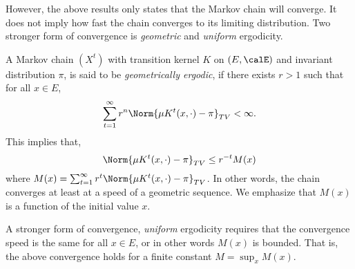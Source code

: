 However, the above results only states that the Markov chain will converge. It does not imply how fast the chain converges to its limiting distribution. Two stronger form of convergence is \emph{geometric} and \emph{uniform} ergodicity.

A Markov chain $(X^t)$ with transition kernel $K$ on $(E,\calE)$ and invariant distribution $\pi$, is said to be \emph{geometrically ergodic}, if there exists $r > 1$ such that for all $x\in E$,
\begin{equation}
  \sum_{t=1}^{\infty} r^n\Norm{\mu K^t(x,\cdot)-\pi}_{TV} <\infty.
\end{equation}
This implies that,
\begin{equation}
  \Norm{\mu K^t(x,\cdot)-\pi}_{TV}\le r^{-t}M(x)
\end{equation}
where $M(x) = \sum_{t=1}^{\infty} r^t\Norm{\mu K^t(x,\cdot)-\pi}_{TV}$. In other words, the chain converges at least at a speed of a geometric sequence. We emphasize that $M(x)$ is a function of the initial value $x$.

A stronger form of convergence, \emph{uniform} ergodicity requires that the convergence speed is the same for all $x\in E$, or in other words $M(x)$ is bounded. That is, the above convergence holds for a finite constant $M = \sup_x M(x)$.